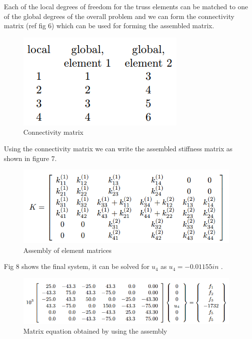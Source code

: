 \documentclass{article}
\begin{document}
Each of the local degrees of freedom for the truss elements can be matched to one of the global degrees of the overall problem and we can form the connectivity matrix (ref fig 6) which can be used for forming the assembled matrix.
\begin{figure}[h!]
\centering
\includegraphics[scale=.6]{7.png}
\caption{Connectivity matrix}
\label{fig:fig1}
\end{figure}
  
Using the connectivity matrix we can write the assembled stiffness matrix as shown in figure 7.
\begin{figure}[h!]
\centering
\includegraphics[scale=.6]{8.png}
\caption{Assembly of element matrices}
\label{fig:fig1}
\end{figure}

Fig 8 shows the final system, it can be solved for $u_4$ as $u_4= -0.01155 in$ .
\begin{figure}[h!]
\centering
\includegraphics[scale=.6]{9.png}
\caption{Matrix equation obtained by using the assembly}
\label{fig:fig1}
\end{figure}
\end{document}
